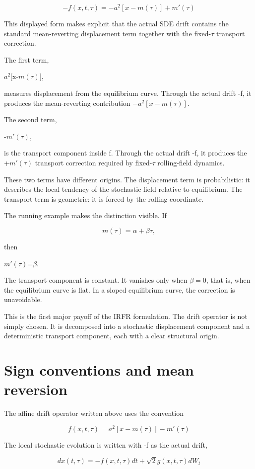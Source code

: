 \documentclass[11pt,oneside]{book}
\begin{document}
\[
-f(x,t,\tau) = -a^2[x-m(\tau)] + m'(\tau)
\]

This displayed form makes explicit that the actual SDE drift contains
the standard mean-reverting displacement term together with the fixed-$\tau$
transport correction.

The first term,

$a^2$[x-$m(\tau)$],

measures displacement from the equilibrium curve. Through the actual
drift -f, it produces the mean-reverting contribution $-a^2[x-m(\tau)]$.

The second term,

-$m'(\tau)$,

is the transport component inside f. Through the actual drift -f, it
produces the +$m'(\tau)$ transport correction required by fixed-$\tau$
rolling-field dynamics.

These two terms have different origins. The displacement term is
probabilistic: it describes the local tendency of the stochastic field
relative to equilibrium. The transport term is geometric: it is forced
by the rolling coordinate.

The running example makes the distinction visible. If

\[
m(\tau)=\alpha+\beta\tau,
\]

then

$m'(\tau)$=$\beta$.

The transport component is constant. It vanishes only when $\beta=0$, that is,
when the equilibrium curve is flat. In a sloped equilibrium curve, the
correction is unavoidable.

This is the first major payoff of the IRFR formulation. The drift
operator is not simply chosen. It is decomposed into a stochastic
displacement component and a deterministic transport component, each
with a clear structural origin.

\section{Sign conventions and mean
reversion}\label{sign-conventions-and-mean-reversion}

The affine drift operator written above uses the convention

\[
f(x,t,\tau) = a^2[x-m(\tau)] - m'(\tau)
\]

The local stochastic evolution is written with -f as the actual drift,

\[
dx(t,\tau) = -f(x,t,\tau)dt + \sqrt{2}g(x,t,\tau)dW_t
\]
\end{document}
